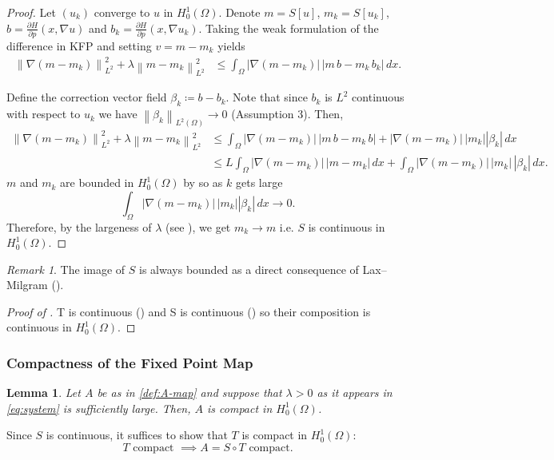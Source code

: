 \documentclass[11pt]{article}
\numberwithin{equation}{section}
\newtheorem{lemma}[lemma]{Lemma}
\theoremstyle{definition}
\theoremstyle{remark}
\newtheorem{remark}[remark]{Remark}
\newcommand{\Ltwo}{L^2(\Omega)}
\newcommand{\Honez}{H_0^1(\Omega)}
\newcommand{\Hp}{\frac{\partial H}{\partial p}}
\newcommand{\norm}[1]{\left\lVert #1 \right\rVert}
\begin{document}
\begin{proof}
  Let $(u_k)$ converge to $u$ in $\Honez$. Denote $m=S[u]$, $m_k=S[u_k]$, $b = \Hp(x, \nabla u)$ and $b_k=\Hp(x,\nabla u_k)$.
  Taking the weak formulation of the difference in KFP and setting $v=m-m_k$ yields
  \begin{align*}
  \norm{\nabla(m-m_k)}_{L^2}^2+\lambda\norm{m-m_k}_{L^2}^2
  &\le \int_\Omega |\nabla(m-m_k)|\,\bigl|m\,b - m_k\,b_k\bigr|\,dx.
  \end{align*}

  Define the correction vector field $\beta_k \coloneqq b - b_k$. Note that since $b_k$ is $L^2$ continuous with respect to $u_k$ we have
  $\norm{\beta_k}_{\Ltwo} \to 0$ (Assumption 3). Then, 
  \begin{align*}
  \norm{\nabla(m-m_k)}_{L^2}^2+\lambda\norm{m-m_k}_{L^2}^2
  &\le \int_\Omega |\nabla(m-m_k)|\,\bigl|m\,b - m_k\, b\bigr| +|\nabla(m-m_k)|\,|m_k||\beta_k|\,dx\\
  &\le L \int_\Omega |\nabla(m-m_k)|\,|m - m_k|\,dx + \int_\Omega |\nabla(m-m_k)|\,|m_k|\,|\beta_k|\,dx.
  \end{align*}
  $m$ and $m_k$ are bounded in $\Honez$ by  so as $k$ gets large \[\int_\Omega|\nabla(m-m_k)|\,|m_k||\beta_k|\,dx \to 0.\] 
  Therefore, by the largeness of
  $\lambda$ (see ), we get $m_k \to m$ i.e. $S$ is continuous in $\Honez$.
\end{proof}

\begin{remark}
  \label{rm:s-bounded}
  The image of $S$ is always bounded as a direct consequence of Lax--Milgram (). 
\end{remark}
\begin{proof}[Proof of ]
  T is continuous () and S is continuous () so their composition is continuous in $\Honez$.
\end{proof}
\subsubsection{Compactness of the Fixed Point Map}
\begin{lemma}
  \label{thm:A-comp}
  Let $A$ be as in \cref{def:A-map} and suppose that $\lambda > 0$ as it appears in \cref{eq:system} is sufficiently large.
  Then, $A$ is compact in $\Honez$. 
\end{lemma}
Since $S$ is continuous, it suffices to show that $T$ is compact in $\Honez$:
\[T \text{ compact } \implies A=S\circ T \text{ compact.}\]
\end{document}
